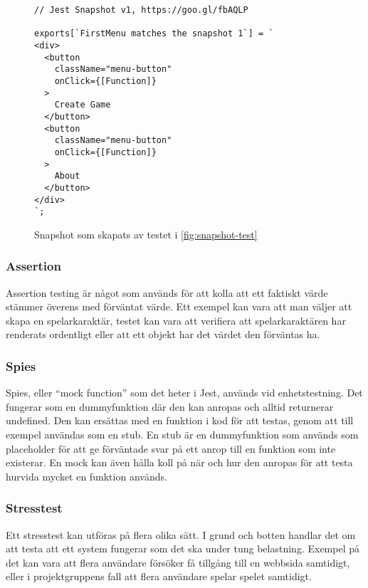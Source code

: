 \lstset{language=Java}
\begin{figure}[h]
  \center
  \begin{minipage}[c]{5cm}
    \begin{lstlisting}
// Jest Snapshot v1, https://goo.gl/fbAQLP

exports[`FirstMenu matches the snapshot 1`] = `
<div>
  <button
    className="menu-button"
    onClick={[Function]}
  >
    Create Game
  </button>
  <button
    className="menu-button"
    onClick={[Function]}
  >
    About
  </button>
</div>
`;

    \end{lstlisting}
  \end{minipage}

  \caption{Snapshot som skapats av testet i \ref{fig:snapshot-test}}
  \label{fig:snapshot-shot}
\end{figure}
\pagebreak

\subsubsection{Assertion}
Assertion testing är något som används för att kolla att ett faktiskt värde stämmer överens med förväntat värde. Ett exempel kan vara att man väljer att skapa en spelarkaraktär, testet kan vara att verifiera att spelarkaraktären har renderats ordentligt eller att ett objekt har det värdet den förväntas ha. 
\subsubsection{Spies}
Spies, eller ``mock function'' \cite{bib-mock} som det heter i Jest, används vid enhetstestning. Det fungerar som en dummyfunktion där den kan anropas och alltid returnerar undefined. Den kan ersättas med en funktion i kod för att testas, genom att till exempel användas som en stub. En stub är en dummyfunktion som används som placeholder för att ge förväntade svar på ett anrop till en funktion som inte existerar. En mock kan även hålla koll på när och hur den anropas för att testa hurvida mycket en funktion används.

\subsubsection{Stresstest}
Ett stresstest kan utföras på flera olika sätt. I grund och botten handlar det om att testa att ett system fungerar som det ska under tung belastning. Exempel på det kan vara att flera användare försöker få tillgång till en webbsida samtidigt, eller i projektgruppens fall att flera användare spelar spelet samtidigt. 

